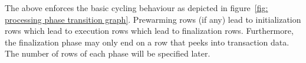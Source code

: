 The above enforces the basic cycling behaviour as depicted in figure~\ref{fig: processing phase transition graph}. Prewarming rows (if any) lead to initialization rows which lead to execution rows which lead to finalization rows. Furthermore, the finalization phase may only end on a row that peeks into transaction data. The number of rows of each phase will be specified later.
